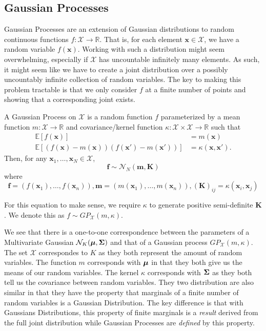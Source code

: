 \subsection{Gaussian Processes}

Gaussian Processes are an extension of Gaussian distributions to random continuous functions $f: \mathcal{X} \to \mathbb{R}$.
That is, for each element $\mathbf{x} \in \mathcal{X}$, we have a random variable $f(\mathbf{x})$.
Working with such a distribution might seem overwhelming, especially if $\mathcal{X}$ has uncountable infinitely many elements.
As such, it might seem like we have to create a joint distribution over a possibly uncountably infinite collection of random variables.
The key to making this problem tractable is that we only consider $f$ at a finite number of points and showing that a corresponding joint exists.

\begin{definition}\label{def:gp}
    A Gaussian Process on $\mathcal{X}$ is a random function $f$ parameterized by a mean function
    $m: \mathcal{X} \to \mathbb{R}$ and covariance/kernel function $\kappa: \mathcal{X} \times \mathcal{X} \to \mathbb{R}$
    such that
    \begin{align*}
        \mathbb{E}[f(\mathbf{x})] &= m(\mathbf{x}) \\
        \mathbb{E}[(f(\mathbf{x}) - m(\mathbf{x}))(f(\mathbf{x}') - m(\mathbf{x}'))] &= \kappa(\mathbf{x}, \mathbf{x}').
    \end{align*}
    Then, for any $\mathbf{x}_1, \dots,\mathbf{x}_N \in \mathcal{X}$,
    \begin{equation*}
        \mathbf{f} \sim \mathcal{N}_N\left(\mathbf{m}, \mathbf{K}\right)
    \end{equation*}
    where
    \begin{equation*}
        \mathbf{f} = (f(\mathbf{x}_1), \dots, f(\mathbf{x}_n)), \mathbf{m} = (m(\mathbf{x}_1), \dots, m(\mathbf{x}_n)), (\mathbf{K})_{ij} = \kappa(\mathbf{x}_i, \mathbf{x}_j)
    \end{equation*}
    
    For this equation to make sense, we require $\kappa$ to generate positive semi-definite $\mathbf{K}$.
    We denote this as $f \sim GP_{\mathcal{X}}(m, \kappa)$.
\end{definition}

We see that there is a one-to-one correspondence between the parameters of a Multivariate Gaussian $\mathcal{N}_{K}(\boldsymbol{\mu}, \boldsymbol{\Sigma})$
and that of a Gaussian process $GP_{ \mathcal{X}}(m, \kappa)$.
The set $\mathcal{X}$ correspondes to $K$ as they both represent the amount of random variables.
The function $m$ corresponds with $\boldsymbol{\mu}$ in that they both give us the means of our random variables.
The kernel $\kappa$ corresponds with $\boldsymbol{\Sigma}$ as they both tell us the covariance between random variables.
They two distribution are also similar in that they have the property that marginals of a finite number of random variables is a Gaussian Distribution.
The key difference is that with Gaussians Distributions, this property of finite marginals is a \emph{result} derived from the full joint distribution
while Gaussian Processes are \emph{defined} by this property.

